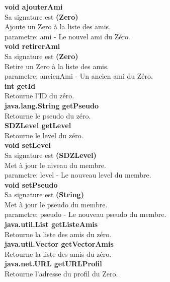\documentclass[10pt]{article}
\begin{document}
\textbf{void ajouterAmi}\\
Sa signature est \textbf{(Zero)}\\
Ajoute un Zero à la liste des amis.\\
parametre: ami - Le nouvel ami du Zéro.\\
\textbf{void retirerAmi}\\
Sa signature est \textbf{(Zero)}\\
Retire un Zero à la liste des amis.\\
parametre: ancienAmi - Un ancien ami du Zéro.\\
\textbf{int getId}\\
Retourne l'ID du zéro.\\
\textbf{java.lang.String getPseudo}\\
Retourne le pseudo du zéro.\\
\textbf{SDZLevel getLevel}\\
Retourne le level du zéro.\\
\textbf{void setLevel}\\
Sa signature est \textbf{(SDZLevel)}\\
Met à jour le niveau du membre.\\
parametre: level - Le nouveau level du membre.\\
\textbf{void setPseudo}\\
Sa signature est \textbf{(String)}\\
Met à jour le pseudo du membre.\\
parametre: pseudo - Le nouveau pseudo du membre.\\
\textbf{java.util.List getListeAmis}\\
Retourne la liste des amis du zéro.\\
\textbf{java.util.Vector getVectorAmis}\\
Retourne la liste des amis du zéro.\\
\textbf{java.net.URL getURLProfil}\\
Retourne l'adresse du profil du Zero.\\
\end{document}
